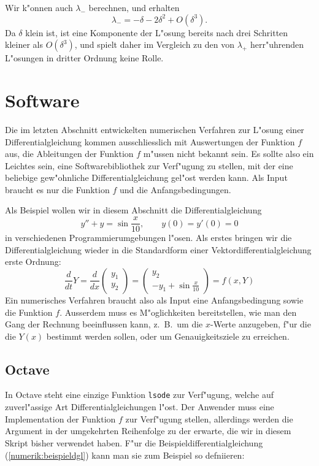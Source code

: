 Wir k"onnen auch $\lambda_-$ berechnen, und erhalten
\[
\lambda_-=-\delta-2\delta^2+O(\delta^3).
\]
Da $\delta$ klein ist, ist eine Komponente der L"osung bereits nach
drei Schritten kleiner als $O(\delta^3)$, und spielt daher im Vergleich
zu den von $\lambda_+$ herr"uhrenden L"osungen in dritter Ordnung keine
Rolle.

\section{Software}
Die im letzten Abschnitt entwickelten numerischen Verfahren zur L"osung
einer Differentialgleichung kommen ausschliesslich mit Auswertungen der
Funktion $f$ aus, die Ableitungen der Funktion $f$ m"ussen nicht bekannt
sein.
Es sollte also ein Leichtes sein, eine Softwarebibliothek zur
Verf"ugung zu stellen, mit der eine beliebige gew"ohnliche
Differentialgleichung gel"ost werden kann.
Als Input braucht es nur die Funktion $f$ und die Anfangsbedingungen.

Als Beispiel wollen wir in diesem Abschnitt die Differentialgleichung
\[
y''+y=\sin \frac{x}{10},\qquad y(0)=y'(0)=0
\]
in verschiedenen Programmierumgebungen l"osen.
Als erstes bringen wir die Differentialgleichung wieder in die Standardform
einer Vektordifferentialgleichung erste Ordnung:
\begin{equation}
\frac{d}{dt}Y
=
\frac{d}{dx}\begin{pmatrix}y_1\\y_2\end{pmatrix}
=
\begin{pmatrix}
y_2\\
-y_1+\sin\frac{x}{10}
\end{pmatrix}
=
f(x,Y)
\label{numerik:beispieldgl}
\end{equation}
Ein numerisches Verfahren braucht also als Input eine Anfangsbedingung
sowie die Funktion $f$.
Ausserdem muss es M"oglichkeiten bereitstellen, wie man den Gang der
Rechnung beeinflussen kann, z.~B.~um die $x$-Werte anzugeben, f"ur die
die $Y(x)$ bestimmt werden sollen, oder um Genauigkeitsziele zu erreichen.

\subsection{Octave}
In Octave steht eine einzige Funktion \texttt{lsode} zur Verf"ugung, welche
auf zuverl"assige Art Differentialgleichungen l"ost.
Der Anwender muss eine Implementation der Funktion $f$ zur Verf"ugung
stellen, allerdings werden die Argument in der umgekehrten Reihenfolge
zu der erwarte, die wir in diesem Skript bisher verwendet haben.
F"ur die Beispieldifferentialgleichung (\ref{numerik:beispieldgl})
kann man sie zum Beispiel so defniieren:


